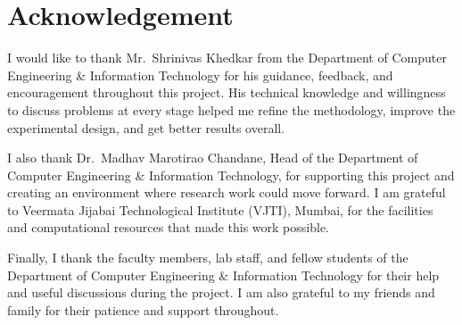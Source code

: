 \chapter*{\centering Acknowledgement}

I would like to thank Mr.~Shrinivas Khedkar from the Department of Computer Engineering \& Information Technology for his guidance, feedback, and encouragement throughout this project. His technical knowledge and willingness to discuss problems at every stage helped me refine the methodology, improve the experimental design, and get better results overall.

I also thank Dr.~Madhav Marotirao Chandane, Head of the Department of Computer Engineering \& Information Technology, for supporting this project and creating an environment where research work could move forward. I am grateful to Veermata Jijabai Technological Institute (VJTI), Mumbai, for the facilities and computational resources that made this work possible.

Finally, I thank the faculty members, lab staff, and fellow students of the Department of Computer Engineering \& Information Technology for their help and useful discussions during the project. I am also grateful to my friends and family for their patience and support throughout.
